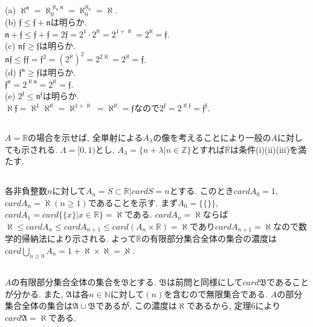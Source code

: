\documentclass{jsarticle}
\begin{document}
\subsection{} %
(a) $\aleph^\mathfrak{n} = \aleph_0^{\aleph_0 \mathfrak{n}} = \aleph_0^{\aleph_0} = \aleph$.\\
(b) $\mathfrak{f} \le \mathfrak{f} + \mathfrak{n}$は明らか.\\
$\mathfrak{n} + \mathfrak{f} \le \mathfrak{f} + \mathfrak{f} = 2 \mathfrak{f} = 2^1 \cdot 2^\aleph = 2^{1 + \aleph} = 2^\aleph = \mathfrak{f}$.\\
(c) $\mathfrak{nf} \ge \mathfrak{f}$は明らか.\\
$\mathfrak{nf} \le \mathfrak{ff} = \mathfrak{f}^2 = (2^\mathfrak{\aleph})^2 = 2^{2\mathfrak{\aleph}} = 2^\mathfrak{\aleph} = \mathfrak{f}$.\\
(d) $\mathfrak{f^n} \ge \mathfrak{f}$は明らか.\\
$\mathfrak{f^n} = 2^{\aleph \mathfrak{n}} = 2^{\aleph} = \mathfrak{f}$.\\
(e) $2^\mathfrak{f} \le \mathfrak{n^f}$は明らか.\\
$\aleph \mathfrak{f} = \aleph^1 \aleph^\aleph = \aleph^{1 + \aleph} = \aleph^\aleph = \mathfrak{f}$なので$2^\mathfrak{f} = 2^{\aleph \mathfrak{f}} = \mathfrak{f}^\mathfrak{f}$.

\subsection{} %
$A = \mathbb{R}$の場合を示せば, 全単射による$A_\lambda$の像を考えることにより一般の$A$に対しても示される. $\Lambda = [0, 1)$とし, $A_\lambda = \{n + \lambda | n \in \mathbb{Z}\}$とすれば$\mathbb{R}$は条件(i)(ii)(iii)を満たす. 

\subsection{} %
各非負整数$n$に対して$A_n = {S \subset \mathbb{R} | card S = n}$とする. このとき$card A_0 = 1$, $card A_n = \aleph(n \ge 1)$であることを示す. まず$A_0 = \{\{\}\}$, $card A_1 = card \{\{x\} | x \in \mathbb{R}\} = \aleph$である. $card A_n = \aleph$ならば$\aleph \le card A_n \le card A_{n + 1} \le card(A_n \times \mathbb{R}) = \aleph$であり$card A_{n + 1} = \aleph$なので数学的帰納法により示される. よって$\mathbb{R}$の有限部分集合全体の集合の濃度は$card \bigcup_{n \ge 0}A_n = 1 + \aleph \times \aleph = \aleph$.

\subsection{} %
$A$の有限部分集合全体の集合を$\mathfrak{B}$とする. $\mathfrak{B}$は前問と同様にして$card \mathfrak{B}$であることが分かる. また, $\mathfrak{A}$は各$n \in \mathbb{N}$に対して$(n)$を含むので無限集合である. $A$の部分集合全体の集合は$\mathfrak{A} \cup \mathfrak{B}$であるが, この濃度は$\aleph$であるから, 定理6により$card \mathfrak{A} = \aleph$である.
\end{document}
